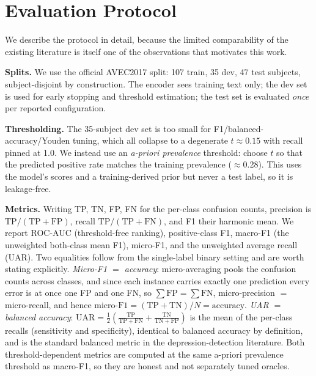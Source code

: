 \documentclass[conference]{IEEEtran}
\begin{document}
\section{Evaluation Protocol}
\label{sec:protocol}

We describe the protocol in detail, because the limited comparability of the
existing literature is itself one of the observations that motivates this work.

\textbf{Splits.} We use the official AVEC2017 split: 107 train, 35 dev, 47
test subjects, subject-disjoint by construction. The encoder
sees training text only; the dev set is used for early stopping and threshold
estimation; the test set is evaluated \emph{once} per reported configuration.

\textbf{Thresholding.} The 35-subject dev set is too small for F1/balanced-
accuracy/Youden tuning, which all collapse to a degenerate $t\!\approx\!0.15$
with recall pinned at 1.0. We instead use an \emph{a-priori prevalence}
threshold: choose $t$ so that the predicted positive rate matches the training
prevalence ($\approx$0.28). This uses the model's scores and a training-derived
prior but never a test label, so it is leakage-free.

\textbf{Metrics.} Writing TP, TN, FP, FN for the per-class confusion counts,
precision is $\mathrm{TP}/(\mathrm{TP}{+}\mathrm{FP})$, recall
$\mathrm{TP}/(\mathrm{TP}{+}\mathrm{FN})$, and F1 their harmonic mean. We report
ROC-AUC (threshold-free ranking), positive-class F1, macro-F1 (the unweighted
both-class mean F1), micro-F1, and the unweighted average recall (UAR). Two
equalities follow from the single-label binary setting and are worth stating
explicitly. \emph{Micro-F1 $=$ accuracy}: micro-averaging pools the confusion
counts across classes, and since each instance carries exactly one prediction
every error is at once one FP and one FN, so $\sum\mathrm{FP}=\sum\mathrm{FN}$,
micro-precision $=$ micro-recall, and hence
$\text{micro-F1}=(\mathrm{TP}{+}\mathrm{TN})/N=\text{accuracy}$.
\emph{UAR $=$ balanced accuracy}:
$\text{UAR}=\tfrac12\!\left(\tfrac{\mathrm{TP}}{\mathrm{TP}+\mathrm{FN}}
+\tfrac{\mathrm{TN}}{\mathrm{TN}+\mathrm{FP}}\right)$ is the mean of the
per-class recalls (sensitivity and specificity), identical to balanced accuracy
by definition, and is the standard balanced metric in the depression-detection
literature. Both threshold-dependent metrics are computed at the same a-priori
prevalence threshold as macro-F1, so they are honest and not separately tuned
oracles.
\end{document}

